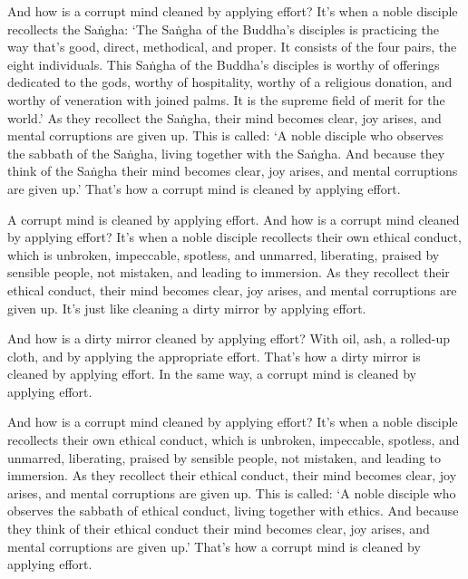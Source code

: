 \documentclass[12pt,openany]{book}%
\begin{document}
And how is a corrupt mind cleaned by applying effort? It’s when a noble disciple recollects the \textsanskrit{Saṅgha}: ‘The \textsanskrit{Saṅgha} of the Buddha’s disciples is practicing the way that’s good, direct, methodical, and proper. It consists of the four pairs, the eight individuals. This \textsanskrit{Saṅgha} of the Buddha’s disciples is worthy of offerings dedicated to the gods, worthy of hospitality, worthy of a religious donation, and worthy of veneration with joined palms. It is the supreme field of merit for the world.’ As they recollect the \textsanskrit{Saṅgha}, their mind becomes clear, joy arises, and mental corruptions are given up. This is called: ‘A noble disciple who observes the sabbath of the \textsanskrit{Saṅgha}, living together with the \textsanskrit{Saṅgha}. And because they think of the \textsanskrit{Saṅgha} their mind becomes clear, joy arises, and mental corruptions are given up.’ That’s how a corrupt mind is cleaned by applying effort. 

A corrupt mind is cleaned by applying effort. And how is a corrupt mind cleaned by applying effort? It’s when a noble disciple recollects their own ethical conduct, which is unbroken, impeccable, spotless, and unmarred, liberating, praised by sensible people, not mistaken, and leading to immersion. As they recollect their ethical conduct, their mind becomes clear, joy arises, and mental corruptions are given up. It’s just like cleaning a dirty mirror by applying effort. 

And how is a dirty mirror cleaned by applying effort? With oil, ash, a rolled-up cloth, and by applying the appropriate effort. That’s how a dirty mirror is cleaned by applying effort. In the same way, a corrupt mind is cleaned by applying effort. 

And how is a corrupt mind cleaned by applying effort? It’s when a noble disciple recollects their own ethical conduct, which is unbroken, impeccable, spotless, and unmarred, liberating, praised by sensible people, not mistaken, and leading to immersion. As they recollect their ethical conduct, their mind becomes clear, joy arises, and mental corruptions are given up. This is called: ‘A noble disciple who observes the sabbath of ethical conduct, living together with ethics. And because they think of their ethical conduct their mind becomes clear, joy arises, and mental corruptions are given up.’ That’s how a corrupt mind is cleaned by applying effort. 
\end{document}
